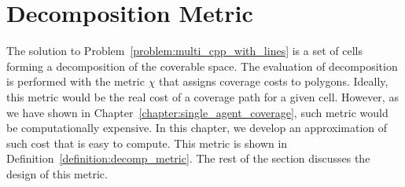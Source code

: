 \documentclass[../main.tex]{subfiles}
\begin{document}


\section{Decomposition Metric}
\label{section:multi_decomposition_metric}

The solution to Problem~\ref{problem:multi_cpp_with_lines} is a set of cells forming a decomposition of the coverable space. The evaluation of decomposition is performed with the metric $\chi$ that assigns coverage costs to polygons. Ideally, this metric would be the real cost of a coverage path for a given cell. However, as we have shown in Chapter~\ref{chapter:single_agent_coverage}, such metric would be computationally expensive. In this chapter, we develop an approximation of such cost that is easy to compute. This metric is shown in Definition~\ref{definition:decomp_metric}. The rest of the section discusses the design of this metric. 
\end{document}
